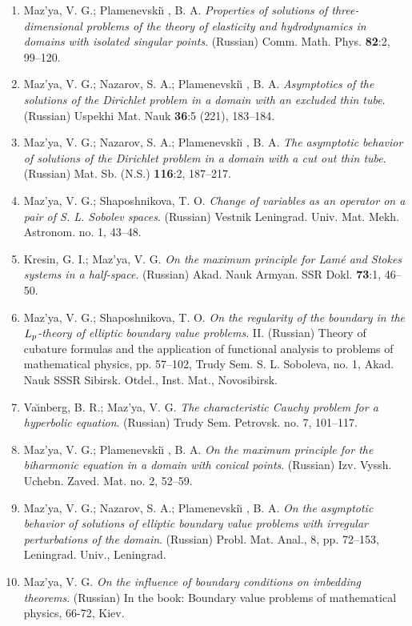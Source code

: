 \documentclass{article}
\begin{document}
\begin{enumerate}
\item Maz'ya, V. G.; Plamenevski{\u\i} , B. A. {\it Properties of
solutions
of three-dimen\-sional problems of the theory of elasticity and
hydrodynamics in domains with isolated singular points}. (Russian)
Comm.
Math. Phys. {\bf 82}:2, 99--120.

\item Maz'ya, V. G.; Nazarov, S. A.; Plamenevski{\u\i} , B. A. {\it
Asymptotics of the solutions of the
Dirichlet problem in a domain with an excluded thin tube}. (Russian)
Uspekhi Mat. Nauk {\bf 36}:5 (221), 183--184.
\item Maz'ya, V. G.; Nazarov, S. A.; Plamenevski{\u\i} , B. A. {\it
The
asymptotic behavior of solutions of the Dirichlet
problem in a domain with a cut out thin tube}. (Russian) Mat. Sb.
(N.S.)
{\bf 116}:2, 187--217.
\item Maz'ya, V. G.; Shaposhnikova, T. O. {\it Change of variables as
an
operator on a pair of S. L. Sobolev
spaces}. (Russian) Vestnik Leningrad. Univ. Mat. Mekh. Astronom. no.
1,
43--48.
\item Kresin, G. I.; Maz'ya, V. G. {\it On the maximum principle for
Lam\'e
and Stokes systems in a half-space}.
(Russian) Akad. Nauk Armyan. SSR Dokl. {\bf 73}:1, 46--50.
\item Maz'ya, V. G.; Shaposhnikova, T. O. {\it On the regularity of
the
boundary in the $L\sb{p}$-theory of
elliptic boundary value problems}. II. (Russian) Theory of cubature
formulas and the application of functional analysis to problems
of mathematical physics, pp. 57--102, Trudy Sem. S. L. Soboleva, no.
1,
Akad. Nauk SSSR Sibirsk. Otdel., Inst. Mat.,
Novosibirsk.
\item Va{\u\i}nberg, B. R.; Maz'ya, V. G. {\it The characteristic
Cauchy
problem for a hyperbolic equation}.
(Russian) Trudy Sem. Petrovsk. no. 7, 101--117.
\item Maz'ya, V. G.; Plamenevski{\u\i} , B. A. {\it On the maximum
principle for the biharmonic equation in a
domain with conical points}. (Russian) Izv. Vyssh. Uchebn. Zaved. Mat.
no.
2, 52--59.
\item Maz'ya, V. G.; Nazarov, S. A.; Plamenevski{\u\i} , B. A. {\it On
the
asymptotic behavior of solutions of
elliptic boundary value problems with irregular perturbations of the
domain}. (Russian)  Probl. Mat. Anal.,
8, pp. 72--153, Leningrad. Univ., Leningrad.
\item Maz'ya, V. G. {\it On the influence of boundary conditions on
imbedding theorems}. (Russian) In the book: Boundary value
problems of mathematical physics, 66-72, Kiev.



\end{enumerate}
\end{document}
